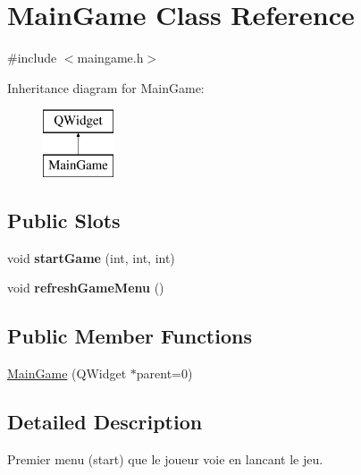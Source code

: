 \hypertarget{class_main_game}{}\section{Main\+Game Class Reference}
\label{class_main_game}


{\ttfamily \#include $<$maingame.\+h$>$}

Inheritance diagram for Main\+Game\+:\begin{figure}[H]
\begin{center}
\leavevmode
\includegraphics[height=2.000000cm]{class_main_game}
\end{center}
\end{figure}
\subsection*{Public Slots}
\begin{DoxyCompactItemize}
\item 
\hypertarget{class_main_game_a550786eddde8209fffabba2c896c22ff}{}void {\bfseries start\+Game} (int, int, int)\label{class_main_game_a550786eddde8209fffabba2c896c22ff}

\item 
\hypertarget{class_main_game_a21e0447f9ff6eeaa12d8abbd7c34aafe}{}void {\bfseries refresh\+Game\+Menu} ()\label{class_main_game_a21e0447f9ff6eeaa12d8abbd7c34aafe}

\end{DoxyCompactItemize}
\subsection*{Public Member Functions}
\begin{DoxyCompactItemize}
\item 
\hyperlink{class_main_game_aba77e63bf031bc452693ba06986affe6}{Main\+Game} (Q\+Widget $\ast$parent=0)
\end{DoxyCompactItemize}


\subsection{Detailed Description}
Premier menu (start) que le joueur voie en lancant le jeu.

